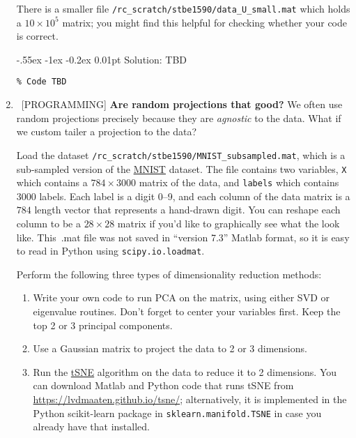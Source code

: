 \documentclass[10pt, letterpaper]{scrartcl}
\makeatletter
\newlength{\savedparindent}
\newcommand\solParagraph{\@startsection{paragraph}{4}{\z@}%
    {-.55ex \@plus -1ex \@minus -0.2ex}%
    {0.01pt}%
    {\raggedsection\normalfont\sectfont\nobreak\size@paragraph}%
}
\newenvironment{solution}{\setlength{\parindent}{\savedparindent}\solParagraph{Solution:}}{}
\makeatother
\begin{document}
\begin{enumerate}[align=left, leftmargin=*, label=\bfseries Problem \arabic*:]
    There is a smaller file \texttt{/rc\_scratch/stbe1590/data\_U\_small.mat} which holds a  $10 \times 10^5$ matrix;  you might find this helpful for checking whether your code is correct.

    
\begin{solution}
TBD
\begin{lstlisting}
% Code TBD
\end{lstlisting}
\end{solution}


   \item \ [PROGRAMMING] \textbf{Are random projections that good?}  We often use random projections precisely because they are \emph{agnostic} to the data. What if we custom tailer a projection to the data?

Load the dataset \texttt{/rc\_scratch/stbe1590/MNIST\_subsampled.mat}, which is a sub-sampled version of the \href{https://en.wikipedia.org/wiki/MNIST_database}{MNIST} dataset. The file contains two variables, \texttt{X} which contains a $784 \times 3000$ matrix of the data, and \texttt{labels} which contains $3000$ labels. Each label is a digit 0--9, and each column of the data matrix is a $784$ length vector that represents a hand-drawn digit. You can reshape each column to be a $28 \times 28$ matrix if you'd like to graphically see what the look like.  This\ .mat file was not saved in ``version 7.3'' Matlab format, so it is easy to read in Python using \texttt{scipy.io.loadmat}.

Perform the following three types of dimensionality reduction methods:
\begin{enumerate}
    \item Write your own code to run PCA on the matrix, using either SVD or eigenvalue routines. Don't forget to center your variables first. Keep the top 2 or 3 principal components.
    \item Use a Gaussian matrix to project the data to 2 or 3 dimensions.
    \item Run the \href{https://en.wikipedia.org/wiki/T-distributed_stochastic_neighbor_embedding}{tSNE} algorithm on the data to reduce it to 2 dimensions. You can download Matlab and Python code that runs tSNE from \url{https://lvdmaaten.github.io/tsne/}; alternatively, it is implemented in the Python scikit-learn package in \texttt{sklearn.manifold.TSNE} in case you already have that installed.
\end{enumerate}


\end{enumerate}
\end{document}
